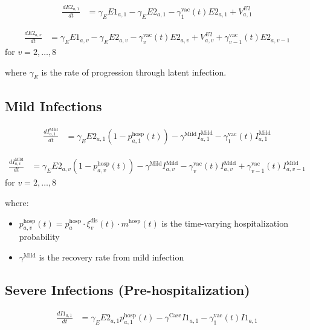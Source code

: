 \documentclass[12pt]{article}
\begin{document}
\begin{align*}
\frac{dE2_{a,1}}{dt} &= \gamma_E E1_{a,1} - \gamma_E E2_{a,1} - \gamma^{\text{vac}}_1(t) E2_{a,1} + V^{E2}_{a,1}
\end{align*}

\begin{align*}
\frac{dE2_{a,v}}{dt} &= \gamma_E E1_{a,v} - \gamma_E E2_{a,v} - \gamma^{\text{vac}}_v(t) E2_{a,v} + V^{E2}_{a,v} + \gamma^{\text{vac}}_{v-1}(t) E2_{a,v-1}
\end{align*}
for $v = 2, \ldots, 8$

where $\gamma_E$ is the rate of progression through latent infection.

\subsection{Mild Infections}

\begin{align*}
\frac{dI^{\text{Mild}}_{a,1}}{dt} &= \gamma_E E2_{a,1} (1 - p^{\text{hosp}}_{a,1}(t)) - \gamma^{\text{Mild}} I^{\text{Mild}}_{a,1} - \gamma^{\text{vac}}_1(t) I^{\text{Mild}}_{a,1}
\end{align*}

\begin{align*}
\frac{dI^{\text{Mild}}_{a,v}}{dt} &= \gamma_E E2_{a,v} (1 - p^{\text{hosp}}_{a,v}(t)) - \gamma^{\text{Mild}} I^{\text{Mild}}_{a,v} - \gamma^{\text{vac}}_v(t) I^{\text{Mild}}_{a,v} + \gamma^{\text{vac}}_{v-1}(t) I^{\text{Mild}}_{a,v-1}
\end{align*}
for $v = 2, \ldots, 8$

where:
\begin{itemize}
    \item $p^{\text{hosp}}_{a,v}(t) = p^{\text{hosp}}_a \cdot \xi^{\text{dis}}_v(t) \cdot m^{\text{hosp}}(t)$ is the time-varying hospitalization probability
    \item $\gamma^{\text{Mild}}$ is the recovery rate from mild infection
\end{itemize}

\subsection{Severe Infections (Pre-hospitalization)}

\begin{align*}
\frac{dI1_{a,1}}{dt} &= \gamma_E E2_{a,1} p^{\text{hosp}}_{a,1}(t) - \gamma^{\text{Case}} I1_{a,1} - \gamma^{\text{vac}}_1(t) I1_{a,1}
\end{align*}
\end{document}
